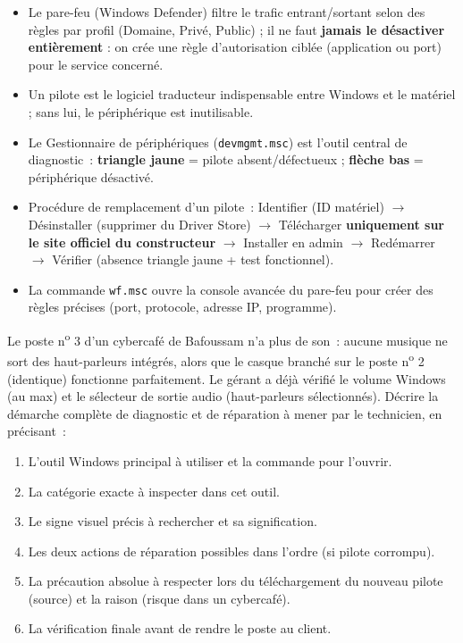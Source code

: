 \documentclass[11pt]{article}
\newcommand{\cle}[1]{{\popxbold\color{popdark}#1}}
\begin{document}
\begin{aretenir}
\begin{itemize}
  \item Le \cle{pare-feu} (Windows Defender) filtre le trafic entrant/sortant selon des règles par profil (Domaine, Privé, Public) ; il ne faut \textbf{jamais le désactiver entièrement} : on crée une règle d'autorisation ciblée (application ou port) pour le service concerné.
  \item Un \cle{pilote} est le logiciel traducteur indispensable entre Windows et le matériel ; sans lui, le périphérique est inutilisable.
  \item Le \cle{Gestionnaire de périphériques} (\texttt{devmgmt.msc}) est l'outil central de diagnostic~: \textbf{triangle jaune} = pilote absent/défectueux ; \textbf{flèche bas} = périphérique désactivé.
  \item Procédure de remplacement d'un pilote~: Identifier (ID matériel) $\rightarrow$ Désinstaller (supprimer du Driver Store) $\rightarrow$ Télécharger \textbf{uniquement sur le site officiel du constructeur} $\rightarrow$ Installer en admin $\rightarrow$ Redémarrer $\rightarrow$ Vérifier (absence triangle jaune + test fonctionnel).
  \item La commande \texttt{wf.msc} ouvre la console avancée du pare-feu pour créer des règles précises (port, protocole, adresse IP, programme).
\end{itemize}
\end{aretenir}

\begin{exercice}
Le poste n\textsuperscript{o} 3 d'un cybercafé de Bafoussam n'a plus de son~: aucune musique ne sort des haut-parleurs intégrés, alors que le casque branché sur le poste n\textsuperscript{o} 2 (identique) fonctionne parfaitement. Le gérant a déjà vérifié le volume Windows (au max) et le sélecteur de sortie audio (haut-parleurs sélectionnés). Décrire la démarche complète de diagnostic et de réparation à mener par le technicien, en précisant~:
\begin{enumerate}
  \item L'outil Windows principal à utiliser et la commande pour l'ouvrir.
  \item La catégorie exacte à inspecter dans cet outil.
  \item Le signe visuel précis à rechercher et sa signification.
  \item Les deux actions de réparation possibles dans l'ordre (si pilote corrompu).
  \item La précaution absolue à respecter lors du téléchargement du nouveau pilote (source) et la raison (risque dans un cybercafé).
  \item La vérification finale avant de rendre le poste au client.
\end{enumerate}
\end{exercice}
\end{document}
